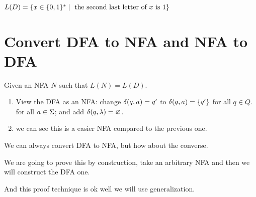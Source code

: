 \documentclass[11pt, cyan, night, 0.5in]{hw}
\begin{document}

$L(D)=\{x\in\{0,1\}^*\mid\text{ the second last letter of $x$ is 1}\}$

\section{Convert DFA to NFA and NFA to DFA}

Given an NFA $N$ such that $L(N)=L(D)$.

\begin{enumerate}
    \item View the DFA as an NFA: change $\delta(q,a)=q'$ to $\delta(q,a)=\{q'\}$ for all $q\in Q.$ for all $a\in \Sigma$; and add $\delta(q,\lambda)=\varnothing$.
    \item {} we can see this is a easier NFA compared to the previous one.
\end{enumerate}

We can always convert DFA to NFA, but how about the converse. 


We are going to prove this by construction, take an arbitrary NFA and then we will construct the DFA one.

And this proof technique is ok well we will use generalization.
\end{document}
